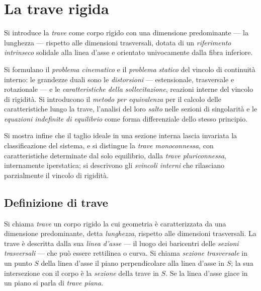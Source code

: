 \graphicspath{{Parti/P04-Travi_rigide/P04-Travi_rigide/Figure/}}
\chapter{La trave rigida}\label{cap:Trave_Rigida}

\begin{sommario}
	Si introduce la \emph{trave} come corpo rigido con
	una dimensione predominante --- la lunghezza ---
	rispetto alle dimensioni trasversali, dotata di un
	\emph{riferimento intrinseco} solidale alla linea
	d'asse e orientato univocamente dalla fibra inferiore.
	
	Si formulano il \emph{problema cinematico} e il
	\emph{problema statico} del vincolo di continuità
	interno: le grandezze duali sono le \emph{distorsioni}
	--- estensionale, trasversale e rotazionale --- e le
	\emph{caratteristiche della sollecitazione}, reazioni
	interne del vincolo di rigidità. Si introducono il
	\emph{metodo per equivalenza} per il calcolo delle
	caratteristiche lungo la trave, l'analisi del loro
	\emph{salto} nelle sezioni di singolarità e le
	\emph{equazioni indefinite di equilibrio} come forma
	differenziale dello stesso principio.
	
	Si mostra infine che il taglio ideale in una sezione
	interna lascia invariata la classificazione del
	sistema, e si distingue la \emph{trave monoconnessa},
	con caratteristiche determinate dal solo equilibrio,
	dalla \emph{trave pluriconnessa}, internamente
	iperstatica; si descrivono gli \emph{svincoli interni}
	che rilasciano parzialmente il vincolo di rigidità.
\end{sommario}



\section{Definizione di trave}
\label{sec:trave_def}


Si chiama \emph{trave} un corpo rigido la cui
geometria è caratterizzata da una dimensione
predominante, detta \emph{lunghezza}, rispetto
alle dimensioni trasversali. La trave è descritta
dalla sua \emph{linea d'asse} --- il luogo dei
baricentri delle \emph{sezioni trasversali} ---
che può essere rettilinea o curva. Si chiama
\emph{sezione trasversale} in un punto $S$ della
linea d'asse il piano perpendicolare alla linea
d'asse in $S$; la sua intersezione con il corpo
è la \emph{sezione} della trave in $S$.
Se la linea d'asse giace in un piano si parla
di \emph{trave piana}.



